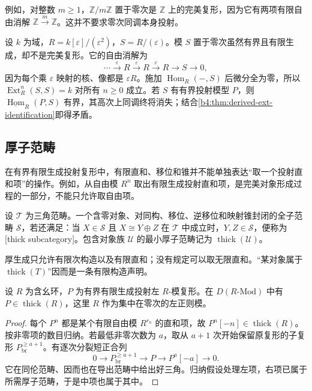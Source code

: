 例如，对整数 \(m\ge1\)，\(\mathbb Z/m\mathbb Z\) 置于零次是 \(\mathbb Z\) 上的完美复形，因为它有两项有限自由消解 \(\mathbb Z\xrightarrow{m}\mathbb Z\)。这并不要求零次同调本身投射。

\begin{example}\label{b4:exm:bounded-not-perfect}
	设 \(k\) 为域，\(R=k[\varepsilon]/(\varepsilon^2)\)，\(S=R/(\varepsilon)\)。模 \(S\) 置于零次虽然有界且有限生成，却不是完美复形。它的自由消解为
	\[
		\cdots\xrightarrow{\varepsilon}R\xrightarrow{\varepsilon}R \xrightarrow{\varepsilon}R\longrightarrow S\longrightarrow0,
	\]
	因为每个乘 \(\varepsilon\) 映射的核、像都是 \(\varepsilon R\)。施加 \(\operatorname{Hom}_R(-,S)\) 后微分全为零，所以 \(\operatorname{Ext}^n_R(S,S)=k\) 对所有 \(n\ge0\) 成立。若 \(S\) 有有界投射模型 \(P\)，则 \(\underline{\operatorname{Hom}}_R(P,S)\) 有界，其高次上同调终将消失；结合\cref{b4:thm:derived-ext-identification}即得矛盾。
\end{example}

\subsection{厚子范畴}
\label{b4:subsec:2002:02}

在有界有限生成投射复形中，有限直和、移位和锥并不能单独表达“取一个投射直和项”的操作。例如，从自由模 \(R^n\) 取出有限生成投射直和项，是完美对象形成过程的一部分，不能只允许取自由项。

\begin{definition}\label{b4:def:thick-subcategory}
	设 \(\mathcal T\) 为三角范畴。一个含零对象、对同构、移位、逆移位和映射锥封闭的全子范畴 \(\mathcal S\)，若还满足：当 \(X\in\mathcal S\) 且 \(X\cong Y\oplus Z\) 在 \(\mathcal T\) 中成立时，\(Y,Z\in\mathcal S\)，便称为[thick subcategory]。包含对象族 \(\mathcal U\) 的最小厚子范畴记为 \(\operatorname{thick}(\mathcal U)\)。
\end{definition}

厚生成只允许有限次构造以及有限直和；没有规定可以取无限直和。“某对象属于 \(\operatorname{thick}(T)\)”因而是一条有限构造声明。

\begin{proposition}\label{b4:prop:perfect-built-from-ring}
	设 \(R\) 为含幺环，\(P\) 为有界有限生成投射左 \(R\)-模复形。在 \(D(R\text{-}\mathrm{Mod})\) 中有 \(P\in\operatorname{thick}(R)\)，这里 \(R\) 作为集中在零次的左正则模。
\end{proposition}
\begin{proof}
	每个 \(P^n\) 都是某个有限自由模 \(R^{r_n}\) 的直和项，故 \(P^n[-n]\in\operatorname{thick}(R)\)。按非零项的数目归纳。若最低非零次数为 \(a\)，取从 \(a+1\) 次开始保留原复形的子复形 \(P^{\ge a+1}_{\mathrm{br}}\)。有逐次分裂短正合列
	\[
		0\longrightarrow P^{\ge a+1}_{\mathrm{br}} \longrightarrow P\longrightarrow P^a[-a]\longrightarrow0.
	\]
	它在同伦范畴、因而也在导出范畴中给出好三角。归纳假设处理左项，右项已属于所需厚子范畴，于是中项也属于其中。
\end{proof}

